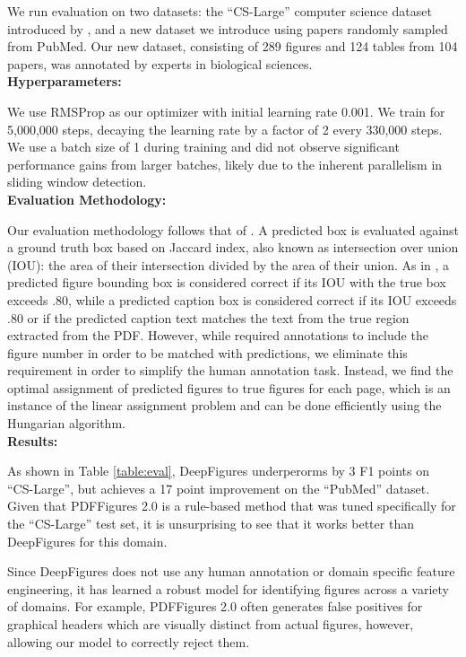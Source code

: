 \documentclass[sigconf]{acmart}
\begin{document}
We run evaluation on two datasets: the ``CS-Large'' computer science dataset introduced by \cite{pdffigures2}, and a new dataset we introduce using papers randomly sampled from PubMed. Our new dataset, consisting of 289 figures and 124 tables  from 104 papers, was annotated by experts in biological sciences.
\\[15pt]\textbf{Hyperparameters:}

We use RMSProp as our optimizer with initial learning rate 0.001. We train for 5,000,000 steps, decaying the learning rate by a factor of 2 every 330,000 steps. We use a batch size of 1 during training and did not observe significant performance gains from larger batches, likely due to the inherent parallelism in sliding window detection.
\\[15pt]\textbf{Evaluation Methodology:}

Our evaluation methodology follows that of \cite{pdffigures2}. A predicted box is evaluated against a ground truth box based on Jaccard index, also known as intersection over union (IOU): the area of their intersection divided by the area of their union. As in \cite{pdffigures2}, a predicted figure bounding box is considered correct if its IOU with the true box exceeds .80, while a predicted caption box is considered correct if its IOU exceeds .80 or if the predicted caption text matches the text from the true region extracted from the PDF. However, while \cite{pdffigures2} required annotations to include the figure number in order to be matched with predictions, we eliminate this requirement in order to simplify the human annotation task. Instead, we find the optimal assignment of predicted figures to true figures for each page, which is an instance of the linear assignment problem and can be done efficiently using the Hungarian algorithm.
\\[15pt]\textbf{Results:}

As shown in Table \ref{table:eval}, DeepFigures underperorms by 3 F1 points on ``CS-Large'', but achieves a 17 point improvement on the ``PubMed'' dataset. 
Given that PDFFigures 2.0 is a rule-based method that was tuned specifically for the ``CS-Large'' test set, it is unsurprising to see that it works better than DeepFigures for this domain. 

Since DeepFigures does not use any human annotation or domain specific feature engineering, it has learned a robust model for identifying figures across a variety of domains.
For example, PDFFigures 2.0 often generates false positives for graphical headers which are visually distinct from actual figures, however, allowing our model to correctly reject them.
\end{document}
